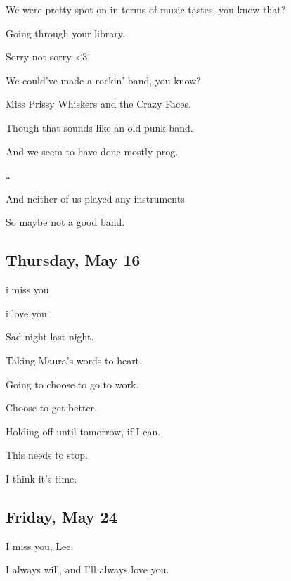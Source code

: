 { We were pretty spot on in terms of music tastes, you know that?

 Going through your library.

 Sorry not sorry \textless{}3

 We could've made a rockin' band, you know?

 Miss Prissy Whiskers and the Crazy Faces.

 Though that sounds like an old punk band.

 And we seem to have done mostly prog.

\ldots{}

 And neither of us played any instruments

 So maybe not a good band.

\newpage

\subsection*{Thursday, May 16}\label{thursday-may-16}

 i miss you

 i love you

 Sad night last night.

 Taking Maura's words to heart.

 Going to choose to go to work.

 Choose to get better.

 Holding off until tomorrow, if I can.

 This needs to stop.

 I think it's time.

\newpage

\subsection*{Friday, May 24}\label{friday-may-24}

 I miss you, Lee.

 I always will, and I'll always love you.

}
